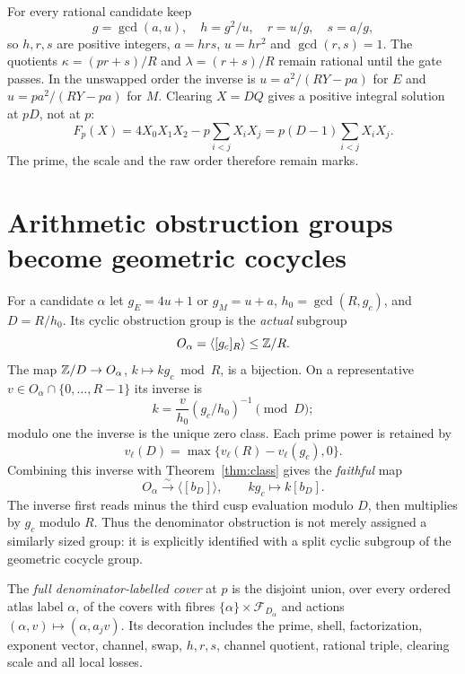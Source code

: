 For every rational candidate keep
\[
 g=\gcd(a,u),\quad h=g^2/u,\quad r=u/g,\quad s=a/g,
\]
so $h,r,s$ are positive integers, $a=hrs$, $u=hr^2$ and $\gcd(r,s)=1$.
The quotients $\kappa=(pr+s)/R$ and $\lambda=(r+s)/R$ remain rational
until the gate passes. In the unswapped order the inverse is
$u=a^2/(RY-pa)$ for $E$ and $u=pa^2/(RY-pa)$ for $M$.
Clearing $X=DQ$ gives a positive integral solution at $pD$, not at $p$:
\[
 F_p(X)=4X_0X_1X_2-p\sum_{i<j}X_iX_j
       =p(D-1)\sum_{i<j}X_iX_j.
\]
The prime, the scale and the raw order therefore remain marks.

\section{Arithmetic obstruction groups become geometric cocycles}
For a candidate $\alpha$ let $g_E=4u+1$ or $g_M=u+a$, $h_0=\gcd(R,g_c)$,
and $D=R/h_0$. Its cyclic obstruction group is the \emph{actual} subgroup
\[
 O_\alpha=\langle[g_c]_R\rangle\le\mathbb Z/R.
\]
The map $\mathbb Z/D\to O_\alpha$, $k\mapsto kg_c\bmod R$, is a bijection.
On a representative $v\in O_\alpha\cap\{0,\ldots,R-1\}$ its inverse is
\[
 k=\frac v{h_0}(g_c/h_0)^{-1}\pmod D;
\]
modulo one the inverse is the unique zero class.
Each prime power is retained by
\[
 v_\ell(D)=\max\{v_\ell(R)-v_\ell(g_c),0\}.
\]
Combining this inverse with Theorem~\ref{thm:class} gives the \emph{faithful}
map
\begin{equation}\label{eq:cohomap}
 O_\alpha\xrightarrow{\sim}\langle[b_D]\rangle,\qquad
 kg_c\longmapsto k[b_D].
\end{equation}
The inverse first reads minus the third cusp evaluation modulo $D$, then
multiplies by $g_c$ modulo $R$. Thus the denominator obstruction is not
merely assigned a similarly sized group: it is explicitly identified
with a split cyclic subgroup of the geometric cocycle group.

\begin{definition}
The \emph{full denominator-labelled cover} at $p$ is the disjoint union,
over every ordered atlas label $\alpha$, of the covers with fibres
$\{\alpha\}\times\mathcal F_{D_\alpha}$ and actions
$(\alpha,v)\mapsto(\alpha,a_jv)$. Its decoration includes the prime,
shell, factorization, exponent vector, channel, swap, $h,r,s$, channel
quotient, rational triple, clearing scale and all local losses.
\end{definition}

